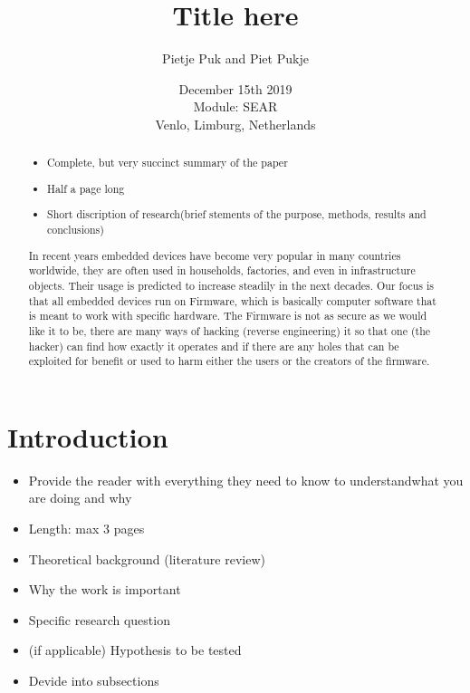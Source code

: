 \documentclass[]{report}
\title{Title here}
\author{Pietje Puk and Piet Pukje}
\date{December 15th 2019 \\Module: SEAR \\Venlo, Limburg, Netherlands}
\begin{document}
\maketitle

\begin{abstract}
	
\begin{itemize}
	\item Complete, but very succinct summary of the paper
	\item Half a page long
	\item Short discription of research(brief stements of the purpose, methods, results and conclusions)
\end{itemize}

In recent years embedded devices have become very popular in many countries worldwide, they are often used in households, factories, and even in infrastructure objects. Their usage is predicted to increase steadily in the next decades. Our focus is that all embedded devices run on Firmware, which is basically computer software that is meant to work with specific hardware. The Firmware is not as secure as we would like it to be, there are many ways of hacking (reverse engineering) it so that one (the hacker) can find how exactly it operates and if there are any holes that can be exploited for benefit or used to harm either the users or the creators of the firmware.
\end{abstract}

\tableofcontents
\setcounter{page}{3}
\listoffigures %
\pagebreak

	
\section{Introduction}

\begin{itemize}
	\item Provide the reader with everything they need to know to understandwhat you are doing and why

	\item Length: max 3 pages
	\item Theoretical background (literature review)
	\item Why the work is important
	\item Specific research question
	\item (if applicable) Hypothesis to be tested
	\item Devide into subsections
\end{itemize}
\end{document}
